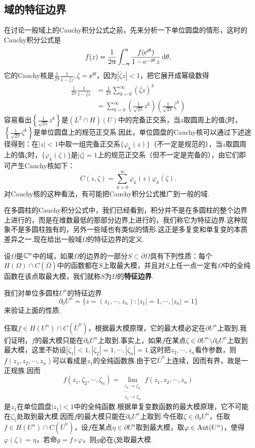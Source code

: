 \subsection{域的特征边界}
在讨论一般域上的Cauchy积分公式之前，先来分析一下单位圆盘的情形，这时的Cauchy积分公式是
\[f(z)=\frac1{2\uppi}\int_{-\uppi}^{\uppi}\frac{f(\operatorname{\!\!\;\mathrm e}^{\mathrm i\theta})}{1-\operatorname{\!\!\;\mathrm e}^{-\mathrm i\theta}z}\mathop{}\!\mathrm{d}\theta,\]
它的Cauchy核是$\frac1{2\pi}\frac1{1-\bar{\zeta}z},\zeta=\ee^{\ii\theta}$，因为$\left|\bar{\zeta}z\right|<1$，把它展开成幂级数得
\begin{align*}
	\frac1{2\pi}\frac1{1-\bar{\zeta}z}
	&=\frac1{2\pi}\sum_{k=0}^{\infty}\left(\bar{\zeta}z\right)^k\\
	&=\sum_{k=0}^{\infty}\left(\frac1{\sqrt{2\pi}}z^k\right)\left(\frac1{\sqrt{2\pi}}\bar{\zeta}^k\right)
\end{align*}
容易看出$\left\{\frac1{\sqrt{2\pi}}z^k\right\}$是$(L^2\cap H)(U)$中的完备正交系，当$z$取圆周上的值$
\zeta$时，$\left\{\frac1{\sqrt{2\pi}}\zeta^k\right\}$是单位圆盘上的规范正交系.因此，单位圆盘的Cauchy核可以通过下述途径得到：在$|z|<1$中取一组完备正交系$\{\varphi_k(z)\}$（不一定是规范的），当$z$取圆周上的值$\zeta$时，$\{\varphi_k(\zeta)\}$是$|\zeta|=1$上的规范正交系（但不一定是完备的），由它们即可产生Cauchy核如下：
\[C(z,\zeta)=\sum_{k=0}^{\infty}\varphi_k(z)\bar{\varphi_k(\zeta)}.\]
对Cauchy核的这种看法，有可能把Cauchy积分公式推广到一般的域.

在多圆柱的Cauchy积分公式中，我们已经看到，积分并不是在多圆柱的整个边界上进行的，而是在维数最低的那部分边界上进行的，我们称它为特征边界.这种现象不是多圆柱独有的，另外一些域也有类似的情形.这正是多复变和单复变的本质差异之一.现在给出一般域$\Omega$的特征边界的定义.
\begin{definition}\label{def4.2.1}
	设$\Omega$是$\mathbb C^n$中的域，如果$\Omega$的边界的一部分$S\subset\partial\Omega$具有下列性质：每个$H(\Omega)\cap C(\bar{\Omega})$中的函数都在$S$上取最大模，并且对$S$上任一点一定有$\Omega$中的全纯函数在该点取最大模，我们就称$S$为$\Omega$的\textbf{特征边界}.
\end{definition}
我们对单位多圆柱$U^n$的特征边界
\[\partial_0 U^n=\{z=(z_1,\cdots,z_n)\colon|z_1|=1,\cdots,|z_n|=1\}\]
来验证上面的性质.

任取$f\in H(U^n)\cap C(\bar{U}^n)$，根据最大模原理，它的最大模必定在$\partial U^n$上取到.我们证明，$f$的最大模只能在$\partial_0 U^n$上取到.事实上，如果$f$在某点$\zeta\in\partial U^n\setminus\partial_0 U^n$上取到最大模，这里不妨设$|\zeta_1|<1,|\zeta_2|=1,\cdots,|\zeta_n|=1$.这时把$z_2,\cdots,z_n$看作参数，则$f(z_1,z_2,\cdots,z_n)$可以看成是$z_1$的全纯函数族.由于它$\bar{U}^n$上连续，因而有界，故是一正规族.因而
\[f(z_1,\zeta_2,\cdots,\zeta_n)=\lim\limits_{\substack{z_2\to\zeta_2\\ \cdots\\ z_n\to\zeta_n}}f(z_1,z_2,\cdots,z_n)\]
是$z_1$在单位圆盘$|z_1|<1$中的全纯函数.根据单复变数函数的最大模原理，它不可能在$\zeta_1$处取到最大模.因而$f$的最大模只能在$\partial_0 U^n$上取到.今任取$\zeta\in\partial_0 U^n$，任取$f\in H(U^n)\cap C(\bar{U}^n)$，设$f$在某点$\eta\in\partial U^n$取到最大模，取$\varphi\in\operatorname{Aut}(U^n)$，使得$\varphi(\zeta)=\eta$，若命$g=f\circ\varphi$，则$g$必在$\zeta$处取最大模.
